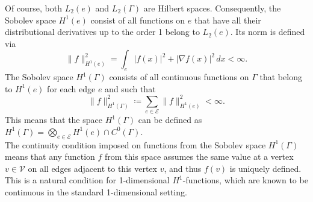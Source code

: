 Of course, both $L_2(e)$ and $L_2(\Gamma)$ are Hilbert spaces. Consequently, the Sobolev space $H^1 (e)$ consist of all functions on $e$ that have all their distributional derivatives up to the order 1 belong to $L_2(e)$. Its norm is defined via
\begin{equation*}
    \lVert f \rVert^{2}_{H^1(e)} = \int_e \lvert f(x) \rvert^2 + \lvert \nabla f(x) \rvert^2 \, dx < \infty.
\end{equation*}
The Sobolev space $H^1 (\Gamma)$ consists of all continuous functions on $\Gamma$ that belong to $H^1 (e)$ for each edge $e$ and such that 
\begin{equation*} 
    \lVert f \rVert^{2}_{H^1 (\Gamma)} \coloneqq \sum_{e \in \mathcal{E}} \lVert f \rVert^{2}_{H^1 (e)} < \infty.
\end{equation*}
This means that the space $H^1 (\Gamma)$ can be defined as $H^1 (\Gamma) =  \bigotimes_{e \in \mathcal{E}} H^1 (e) \cap C^{0}(\Gamma)$.\\
The continuity condition imposed on functions from the Sobolev space $H^1 (\Gamma)$ means that any function $f$ from this space assumes the same value at a vertex $v \in \mathcal{V}$ on all edges adjacent to this vertex $v$, and thus $f(v)$ is uniquely defined. This is a natural condition for 1-dimensional $H^1$-functions, which are known to be continuous in the standard 1-dimensional setting. \\

